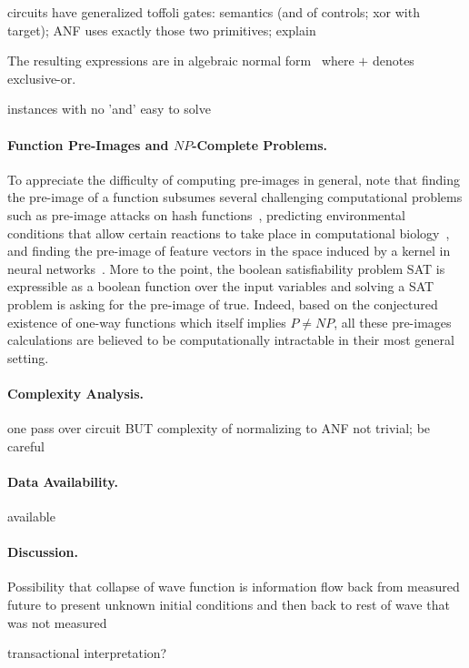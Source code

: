 \documentclass{article}
\begin{document}
circuits have generalized toffoli gates: semantics (and of controls;
xor with target); ANF uses exactly those two primitives; explain

The resulting
expressions are in algebraic normal form~\cite{TOKAREVA20151} where
$+$ denotes exclusive-or. 

instances with no 'and' easy to solve


\paragraph*{Function Pre-Images and $\mathit{NP}$-Complete Problems.}
To appreciate the difficulty of computing pre-images in general, note
that finding the pre-image of a function subsumes several challenging
computational problems such as pre-image attacks on hash
functions~\cite{10.1007/978-3-540-25937-4_24}, predicting
environmental conditions that allow certain reactions to take place in
computational biology~\cite{Klotz2013,akutsu2009analyses}, and finding
the pre-image of feature vectors in the space induced by a kernel in
neural networks~\cite{1353287}. More to the point, the boolean
satisfiability problem SAT is expressible as a boolean function over
the input variables and solving a SAT problem is asking for the
pre-image of \textsf{true}. Indeed, based on the conjectured existence
of one-way functions which itself implies $\mathit{P} \neq
\mathit{NP}$, all these pre-images calculations are believed to be
computationally intractable in their most general setting.

\paragraph*{Complexity Analysis.}
one pass over circuit BUT complexity of normalizing to ANF not trivial; be careful

\paragraph*{Data Availability.} available 

\paragraph*{Discussion.}
Possibility that collapse of wave function is information flow back
from measured future to present unknown initial conditions and then
back to rest of wave that was not measured

transactional interpretation?
\end{document}

